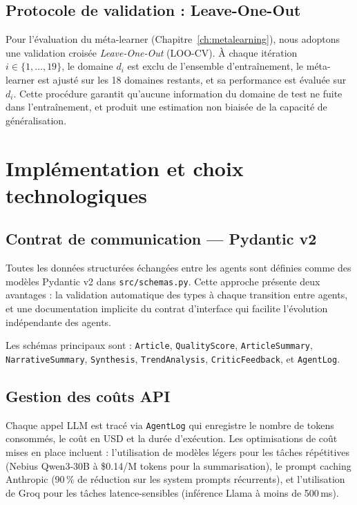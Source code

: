 \subsection{Protocole de validation : Leave-One-Out}

Pour l'évaluation du méta-learner (Chapitre~\ref{ch:metalearning}),
nous adoptons une validation croisée \textit{Leave-One-Out} (LOO-CV).
À chaque itération $i \in \{1, \ldots, 19\}$, le domaine $d_i$ est
exclu de l'ensemble d'entraînement, le méta-learner est ajusté sur les
18 domaines restants, et sa performance est évaluée sur $d_i$. Cette
procédure garantit qu'aucune information du domaine de test ne fuite
dans l'entraînement, et produit une estimation non biaisée de la
capacité de généralisation.

\section{Implémentation et choix technologiques}

\subsection{Contrat de communication — Pydantic v2}

Toutes les données structurées échangées entre les agents sont définies
comme des modèles Pydantic v2 \cite{pydantic2024} dans \texttt{src/schemas.py}.
Cette approche présente deux avantages : la validation automatique des types
à chaque transition entre agents, et une documentation implicite du
contrat d'interface qui facilite l'évolution indépendante des agents.

Les schémas principaux sont : \texttt{Article}, \texttt{QualityScore},
\texttt{ArticleSummary}, \texttt{NarrativeSummary}, \texttt{Synthesis},
\texttt{TrendAnalysis}, \texttt{CriticFeedback}, et \texttt{AgentLog}.

\subsection{Gestion des coûts API}

Chaque appel LLM est tracé via \texttt{AgentLog} qui enregistre le nombre
de tokens consommés, le coût en USD et la durée d'exécution. Les optimisations
de coût mises en place incluent : l'utilisation de modèles légers pour
les tâches répétitives (Nebius Qwen3-30B à \$0.14/M tokens pour la
summarisation), le prompt caching Anthropic (90\,\% de réduction sur
les system prompts récurrents), et l'utilisation de Groq pour les tâches
latence-sensibles (inférence Llama à moins de 500\,ms).
